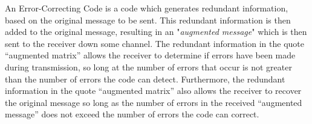 \documentclass[ClusteringConnectionsMAIN.tex]{subfiles}
\begin{document}
  An Error-Correcting Code is a code which generates redundant information, based on the original message to be sent.  This redundant information is then added to the original message, resulting in an "\emph{augmented message}" which is then sent to the receiver down some channel.  The redundant information in the quote “augmented matrix” allows the receiver to determine if errors have been made during transmission, so long at the number of errors that occur is not greater than the number of errors the code can detect.  Furthermore, the redundant information in the quote “augmented matrix” also allows the receiver to recover the original message so long as the number of errors in the received “augmented message” does not exceed the number of errors the code can correct.  
\end{document}
